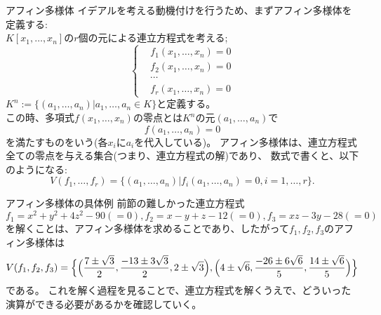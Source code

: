 \begin{frame} {アフィン多様体}
	イデアルを考える動機付けを行うため、まずアフィン多様体を定義する: \\
	$K[x_1,\ldots,x_n]$の$r$個の元による連立方程式を考える;
	\begin{equation}
		\left\{
		\begin{aligned}
			 & f_1(x_1,\ldots,x_n) = 0 \\
			 & f_2(x_1,\ldots,x_n) = 0 \\
			 & \cdots                  \\
			 & f_r(x_1,\ldots,x_n) = 0
		\end{aligned}
		\right.
	\end{equation}
	$K^n := \{(a_1, \ldots, a_n) | a_1, \ldots, a_n \in K \}$と定義する。 \\
	この時、多項式$f(x_1,\ldots,x_n)$の零点とは$K^n$の元$(a_1, \ldots, a_n)$で
	\begin{equation*}
		f(a_1, \ldots, a_n) = 0
	\end{equation*}
	を満たすものをいう(各$x_i$に$a_i$を代入している)。
	アフィン多様体は、連立方程式全ての零点を与える集合(つまり、連立方程式の解)であり、
	数式で書くと、以下のようになる:
	\begin{equation}
		V(f_1, \ldots, f_r) = \{(a_1, \ldots, a_n) | f_i(a_1, \ldots, a_n) = 0, i=1,\ldots,r\}.
	\end{equation}

\end{frame}

\begin{frame} {アフィン多様体の具体例}
	前節の難しかった連立方程式
	$f_1=x^2+y^2+4z^2-90(=0), f_2=x-y+z-12(=0), f_3=xz-3y-28(=0)$
	を解くことは、アフィン多様体を求めることであり、したがって$f_1,f_2,f_3$のアフィン多様体は
	\begin{equation*}
		V(f_1, f_2, f_3) = \Bigl\{
		\Bigl(\frac{7\pm\sqrt{3}}{2}, \frac{-13\pm3\sqrt{3}}{2}, 2\pm\sqrt{3} \Bigr),
		\Bigl(4\pm\sqrt{6}, \frac{-26\pm6\sqrt{6}}{5}, \frac{14\pm\sqrt{6}}{5} \Bigr)
		\Bigr\}
	\end{equation*}
	である。
	これを解く過程を見ることで、連立方程式を解くうえで、どういった演算ができる必要があるかを確認していく。
\end{frame}

